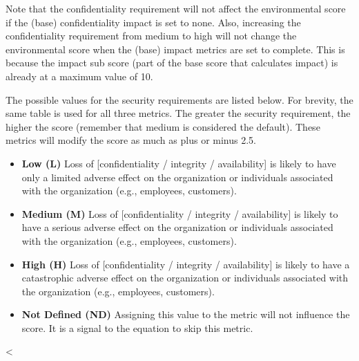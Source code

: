     Note that the confidentiality requirement will not affect the
    environmental score if the (base) confidentiality impact is set to none.
    Also, increasing the confidentiality requirement from medium to high
    will not change the environmental score when the (base) impact metrics
    are set to complete. This is because the impact sub score (part of the
    base score that calculates impact) is already at a maximum value of 10.

    The possible values for the security requirements are listed below. For
    brevity, the same table is used for all three metrics. The greater the
    security requirement, the higher the score (remember that medium is considered
    the default). These metrics will modify the score as much as plus or minus
    2.5.

    \begin{itemize}
      \item
        \textbf{Low (L)} Loss of {[}confidentiality / integrity /
        availability{]} is likely to have only a limited adverse effect on the
        organization or individuals associated with the organization (e.g.,
        employees, customers).
      \item
        \textbf{Medium (M)} Loss of {[}confidentiality / integrity /
        availability{]} is likely to have a serious adverse effect on the
        organization or individuals associated with the organization (e.g.,
        employees, customers).
      \item
        \textbf{High (H)} Loss of {[}confidentiality / integrity /
        availability{]} is likely to have a catastrophic adverse effect on the
        organization or individuals associated with the organization (e.g.,
        employees, customers).
      \item
        \textbf{Not Defined (ND)} Assigning this value to the metric will not
        influence the score. It is a signal to the equation to skip this
        metric.
    \end{itemize}


<%
